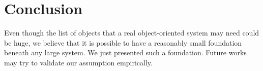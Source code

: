 
\section{Conclusion}\label{sec:conclusion}

Even though the list of objects that a real object-oriented system may need
  could be huge, we believe that it is possible to have a reasonably small
  foundation beneath any large system.
We just presented such a foundation.
Future works may try to validate our assumption empirically.
